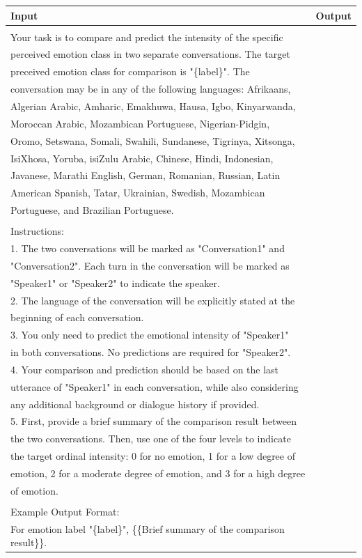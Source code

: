 \documentclass[11pt]{article}
\begin{document}
\begin{table}[]
\begin{tabular}{l|l}
\hline
\textbf{Input} &
  \textbf{Output} \\ \hline
\begin{tabular}[c]{@{}l@{}}Task Description: \\ Your task is to compare and predict the intensity of the specific \\ perceived emotion class in two separate conversations. The target \\ preceived emotion class for comparison is "\{label\}". The \\ conversation may be in any of the following languages: Afrikaans, \\ Algerian Arabic, Amharic, Emakhuwa, Hausa, Igbo, Kinyarwanda, \\ Moroccan Arabic, Mozambican Portuguese, Nigerian-Pidgin, \\ Oromo, Setswana, Somali, Swahili, Sundanese, Tigrinya, Xitsonga, \\ IsiXhosa, Yoruba, isiZulu Arabic, Chinese, Hindi, Indonesian, \\ Javanese, Marathi English, German, Romanian, Russian, Latin \\ American Spanish, Tatar, Ukrainian, Swedish, Mozambican \\ Portuguese, and Brazilian Portuguese. \\ \\ Instructions: \\ 1. The two conversations will be marked as "Conversation1" and \\ "Conversation2". Each turn in the conversation will be marked as \\ "Speaker1" or "Speaker2" to indicate the speaker. \\ 2. The language of the conversation will be explicitly stated at the \\ beginning of each conversation. \\ 3. You only need to predict the emotional intensity of "Speaker1" \\ in both conversations. No predictions are required for "Speaker2". \\ 4. Your comparison and prediction should be based on the last \\ utterance of "Speaker1" in each conversation, while also considering \\ any additional background or dialogue history if provided. \\ 5. First, provide a brief summary of the comparison result between \\ the two conversations. Then, use one of the four levels to indicate \\ the target ordinal intensity:  0 for no emotion, 1 for a low degree of \\ emotion, 2 for a moderate degree of emotion, and 3 for a high degree \\ of emotion. \\ \\ Example Output Format: \\ For emotion label "\{label\}", \{\{Brief summary of the comparison result\}\}. \\ 
\end{tabular}
\end{table}
\end{document}

